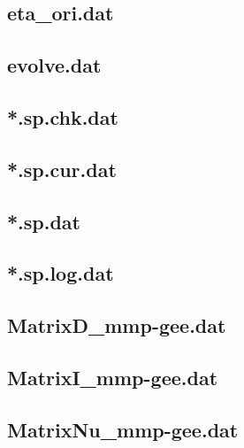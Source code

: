 \subsection{eta\_ori.dat}

\subsection{evolve.dat}

\subsection{*.sp.chk.dat}

\subsection{*.sp.cur.dat}

\subsection{*.sp.dat}

\subsection{*.sp.log.dat}

\subsection{MatrixD\_mmp-gee.dat}

\subsection{MatrixI\_mmp-gee.dat}

\subsection{MatrixNu\_mmp-gee.dat}

